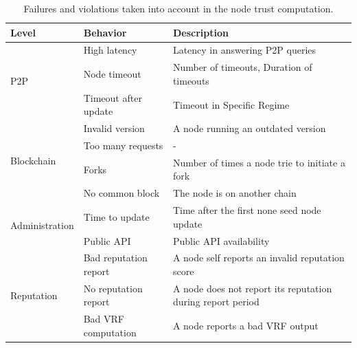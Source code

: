 \documentclass[]{article}
\begin{document}
\begin{table}[]
\centering
\begin{tabular}{|l|l|p{7cm}|}
\hline
Level                           & Behavior              & Description                                                \\ \hline
\multirow{3}{*}{P2P}            & High latency          & Latency in answering P2P queries                           \\ \cline{2-3} 
                                & Node timeout          & Number of timeouts, Duration of timeouts                   \\ \cline{2-3} 
                                & Timeout after update  & Timeout in Specific Regime                                 \\ \hline
\multirow{4}{*}{Blockchain}     & Invalid version       & A node running an outdated version                         \\ \cline{2-3} 
                                & Too many requests     & -                                                          \\ \cline{2-3} 
                                & Forks                 & Number of times a node trie to initiate a fork             \\ \cline{2-3} 
                                & No common block       & The node is on another chain                               \\ \hline
\multirow{2}{*}{Administration} & Time to update        & Time after the first none seed node update                 \\ \cline{2-3} 
                                & Public API            & Public API availability                                    \\ \hline
\multirow{3}{*}{Reputation}     & Bad reputation report & A node self reports an invalid reputation score            \\ \cline{2-3} 
                                & No reputation report  & A node does not report its reputation during report period \\ \cline{2-3} 
                                & Bad VRF computation   & A node reports a bad VRF output                            \\ \hline\end{tabular}

\caption{Failures and violations taken into account in the node trust computation.}
\label{tab:violations}
\end{table}
\end{document}
